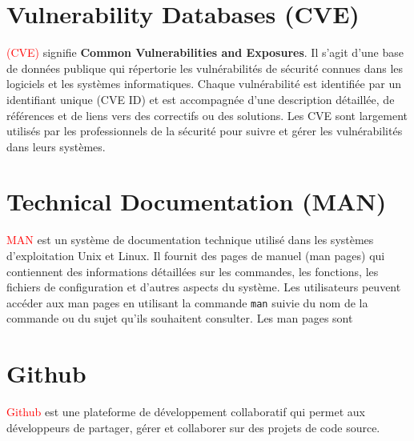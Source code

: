 \documentclass[11pt,a4paper]{book}
\begin{document}
\section{Vulnerability Databases (CVE)}
\textcolor{red}{(CVE)} signifie \textbf{Common Vulnerabilities and Exposures}. Il s'agit d'une base de données publique qui répertorie les vulnérabilités de sécurité connues dans les logiciels et les systèmes informatiques. Chaque vulnérabilité est identifiée par un identifiant unique (CVE ID) et est accompagnée d'une description détaillée,
 de références et de liens vers des correctifs ou des solutions. Les CVE sont largement utilisés par les professionnels de la sécurité pour suivre et gérer les vulnérabilités dans leurs systèmes.

\section{Technical Documentation (MAN)}
\textcolor{red}{MAN} est un système de documentation technique utilisé dans les systèmes d'exploitation Unix et Linux. Il fournit des pages de manuel (man pages) qui contiennent des informations détaillées sur les commandes, les fonctions, 
les fichiers de configuration et d'autres aspects du système. Les utilisateurs peuvent accéder aux man pages en utilisant la commande \texttt{man} suivie du nom de la commande ou du sujet qu'ils souhaitent consulter. Les man pages sont

\section{Github}
\textcolor{red}{Github} est une plateforme de développement collaboratif qui permet aux développeurs de partager, gérer et collaborer sur des projets de code source.
\end{document}
